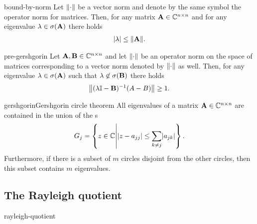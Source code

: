 \begin{Lemma}{bound-by-norm}
  Let $\norm{\cdot}$ be a vector norm and denote by the same symbol
  the operator norm for matrices. Then, for any matrix $\mata\in\Cnn$
  and for any eigenvalue $\lambda\in\sigma(\mata)$ there holds
  \begin{gather}
    \abs{\lambda} \le \norm{\mata}.
  \end{gather}
\end{Lemma}

\begin{Lemma}{pre-gershgorin}
  Let $\mata,\matb\in\Cnn$ and let $\norm{\cdot}$ be an operator norm
  on the space of matrices corresponding to a vector norm denoted by
  $\norm{\cdot}$ as well. Then, for any eigenvalue
  $\lambda\in\sigma(\mata)$ such that $\lambda\not\in\sigma(\matb)$
  there holds
  \begin{gather}
    \norm*{(\lambda\id-\matb)^{-1}(A-B)} \ge 1.
  \end{gather}
\end{Lemma}


\begin{Theorem*}{gershgorin}{Gershgorin circle theorem}
  All eigenvalues of a matrix $\mata\in\Cnn$ are contained in the
  union of the s
  \begin{gather}
    G_j = \left\{ z\in \C \middle| \abs{z-a_{jj}} \le \sum_{k\neq j} \abs{a_{jk}}\right\}. 
  \end{gather}
  Furthermore, if there is a subset of $m$ circles disjoint from the
  other circles, then this subset contains $m$ eigenvalues.
\end{Theorem*}

\subsection{The Rayleigh quotient}

\begin{Definition}{rayleigh-quotient}
  
\end{Definition}

